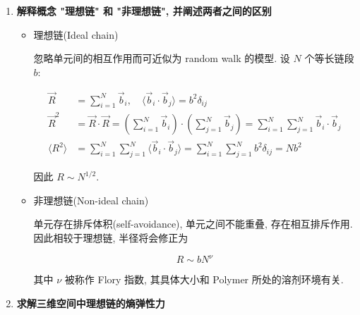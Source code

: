 \documentclass[../../main.tex]{subfiles}
\begin{document}
\begin{enumerate}
    \item \textbf{解释概念 "理想链" 和 "非理想链", 并阐述两者之间的区别}
    
\begin{itemize}
    \item 理想链(Ideal chain)

忽略单元间的相互作用而可近似为 random walk 的模型. 设 $N$ 个等长链段 $b$: 

$$
\begin{aligned}
\vec{R} &= \sum_{i=1}^{N}\vec{b}_{i},\quad \langle\vec{b}_{i}\cdot\vec{b}_{j}\rangle = b^{2}\delta_{ij}\\
\vec{R}^{2} &= \vec{R}\cdot\vec{R} = \left(\sum_{i=1}^{N}\vec{b}_{i}\right)\cdot\left(\sum_{j=1}^{N}\vec{b}_{j}\right) = \sum_{i=1}^{N}\sum_{j=1}^{N}\vec{b}_{i}\cdot\vec{b}_{j}\\
\langle R^{2}\rangle &= \sum_{i=1}^{N}\sum_{j=1}^{N}\langle \vec{b}_{i}\cdot\vec{b}_{j}\rangle = \sum_{i=1}^{N}\sum_{j=1}^{N} b^{2}\delta_{ij} = Nb^{2}
\end{aligned}
$$

因此 $R\sim N^{1/2}$.
    \item 非理想链(Non-ideal chain)

单元存在排斥体积(self-avoidance), 单元之间不能重叠, 存在相互排斥作用. 因此相较于理想链, 半径将会修正为

$$
R\sim bN^{\nu}
$$

其中 $\nu$ 被称作 Flory 指数, 其具体大小和 Polymer 所处的溶剂环境有关. 
\end{itemize}

    \item \textbf{求解三维空间中理想链的熵弹性力}
    
{}
\end{enumerate}
\end{document}

